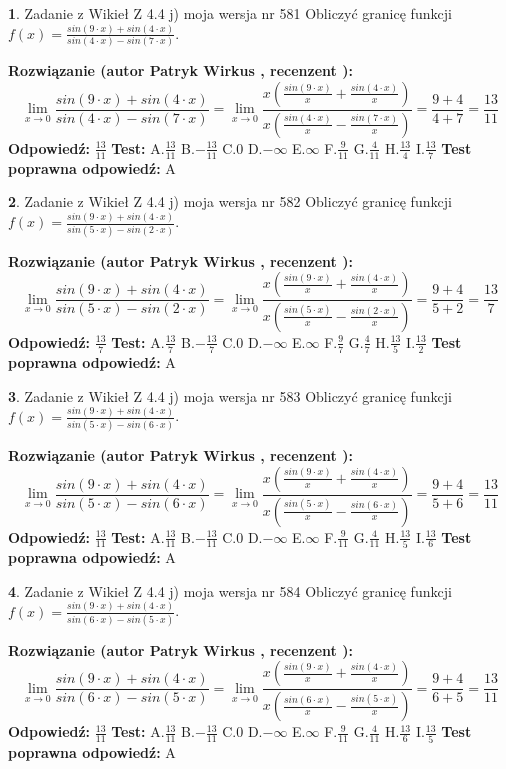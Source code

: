 \documentclass[12pt, a4paper]{article}
\theoremstyle{definition} %
\newtheorem{zad}{}
\newcommand{\zadStart}[1]{\begin{zad}#1\newline}
\newcommand{\zadStop}{\end{zad}}
\newcommand{\rozwStart}[2]{\noindent \textbf{Rozwiązanie (autor #1 , recenzent #2): }\newline}
\newcommand{\rozwStop}{\newline}
\newcommand{\odpStart}{\noindent \textbf{Odpowiedź:}\newline}
\newcommand{\odpStop}{\newline}
\newcommand{\testStart}{\noindent \textbf{Test:}\newline}
\newcommand{\testStop}{\newline}
\newcommand{\kluczStart}{\noindent \textbf{Test poprawna odpowiedź:}\newline}
\newcommand{\kluczStop}{\newline}
\begin{document}
\zadStart{Zadanie z Wikieł Z 4.4 j) moja wersja nr 581}
Obliczyć granicę funkcji $f(x)=\frac{sin(9\cdot x) +sin(4\cdot x)}{sin(4\cdot x) -sin(7\cdot x)}$.
\zadStop
\rozwStart{Patryk Wirkus}{}
$$\lim\limits_{x\to 0}\frac{sin(9\cdot x) +sin(4\cdot x)}{sin(4\cdot x) -sin(7\cdot x)}=\lim\limits_{x\to 0}\frac{x(\frac{sin(9\cdot x)}{x}+\frac{sin(4\cdot x)}{x})}{x(\frac{sin(4\cdot x)}{x}-\frac{sin(7\cdot x)}{x})}=\frac{9+4}{4+7} = \frac{13}{11}$$
\rozwStop
\odpStart
$\frac{13}{11}$
\odpStop
\testStart
A.$\frac{13}{11}$
B.$-\frac{13}{11}$
C.$0$
D.$-\infty$
E.$\infty$
F.$\frac{9}{11}$
G.$\frac{4}{11}$
H.$\frac{13}{4}$
I.$\frac{13}{7}$
\testStop
\kluczStart
A
\kluczStop



\zadStart{Zadanie z Wikieł Z 4.4 j) moja wersja nr 582}
Obliczyć granicę funkcji $f(x)=\frac{sin(9\cdot x) +sin(4\cdot x)}{sin(5\cdot x) -sin(2\cdot x)}$.
\zadStop
\rozwStart{Patryk Wirkus}{}
$$\lim\limits_{x\to 0}\frac{sin(9\cdot x) +sin(4\cdot x)}{sin(5\cdot x) -sin(2\cdot x)}=\lim\limits_{x\to 0}\frac{x(\frac{sin(9\cdot x)}{x}+\frac{sin(4\cdot x)}{x})}{x(\frac{sin(5\cdot x)}{x}-\frac{sin(2\cdot x)}{x})}=\frac{9+4}{5+2} = \frac{13}{7}$$
\rozwStop
\odpStart
$\frac{13}{7}$
\odpStop
\testStart
A.$\frac{13}{7}$
B.$-\frac{13}{7}$
C.$0$
D.$-\infty$
E.$\infty$
F.$\frac{9}{7}$
G.$\frac{4}{7}$
H.$\frac{13}{5}$
I.$\frac{13}{2}$
\testStop
\kluczStart
A
\kluczStop



\zadStart{Zadanie z Wikieł Z 4.4 j) moja wersja nr 583}
Obliczyć granicę funkcji $f(x)=\frac{sin(9\cdot x) +sin(4\cdot x)}{sin(5\cdot x) -sin(6\cdot x)}$.
\zadStop
\rozwStart{Patryk Wirkus}{}
$$\lim\limits_{x\to 0}\frac{sin(9\cdot x) +sin(4\cdot x)}{sin(5\cdot x) -sin(6\cdot x)}=\lim\limits_{x\to 0}\frac{x(\frac{sin(9\cdot x)}{x}+\frac{sin(4\cdot x)}{x})}{x(\frac{sin(5\cdot x)}{x}-\frac{sin(6\cdot x)}{x})}=\frac{9+4}{5+6} = \frac{13}{11}$$
\rozwStop
\odpStart
$\frac{13}{11}$
\odpStop
\testStart
A.$\frac{13}{11}$
B.$-\frac{13}{11}$
C.$0$
D.$-\infty$
E.$\infty$
F.$\frac{9}{11}$
G.$\frac{4}{11}$
H.$\frac{13}{5}$
I.$\frac{13}{6}$
\testStop
\kluczStart
A
\kluczStop



\zadStart{Zadanie z Wikieł Z 4.4 j) moja wersja nr 584}
Obliczyć granicę funkcji $f(x)=\frac{sin(9\cdot x) +sin(4\cdot x)}{sin(6\cdot x) -sin(5\cdot x)}$.
\zadStop
\rozwStart{Patryk Wirkus}{}
$$\lim\limits_{x\to 0}\frac{sin(9\cdot x) +sin(4\cdot x)}{sin(6\cdot x) -sin(5\cdot x)}=\lim\limits_{x\to 0}\frac{x(\frac{sin(9\cdot x)}{x}+\frac{sin(4\cdot x)}{x})}{x(\frac{sin(6\cdot x)}{x}-\frac{sin(5\cdot x)}{x})}=\frac{9+4}{6+5} = \frac{13}{11}$$
\rozwStop
\odpStart
$\frac{13}{11}$
\odpStop
\testStart
A.$\frac{13}{11}$
B.$-\frac{13}{11}$
C.$0$
D.$-\infty$
E.$\infty$
F.$\frac{9}{11}$
G.$\frac{4}{11}$
H.$\frac{13}{6}$
I.$\frac{13}{5}$
\testStop
\kluczStart
A
\kluczStop
\end{document}
